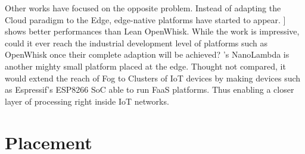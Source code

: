 \documentclass[11pt]{sdm}
\begin{document}
Other works have focused on the opposite problem. Instead of adapting the Cloud paradigm to the Edge, edge-native platforms have started to appear. \citet{pfandzelter_tinyfaas_2020}] shows better performances than Lean OpenWhisk. While the work is impressive, could it ever reach the industrial development level of platforms such as OpenWhisk once their complete adaption will be achieved? 's NanoLambda is another mighty small platform placed at the edge. Thought not compared, it would extend the reach of Fog to Clusters of IoT devices by making devices such as Espressif's ESP8266 \gls{SoC} \cite{noauthor_esp8266_nodate} able to run \gls{FaaS} platforms. Thus enabling a closer layer of processing right inside IoT networks.


\section{Placement}
\end{document}
